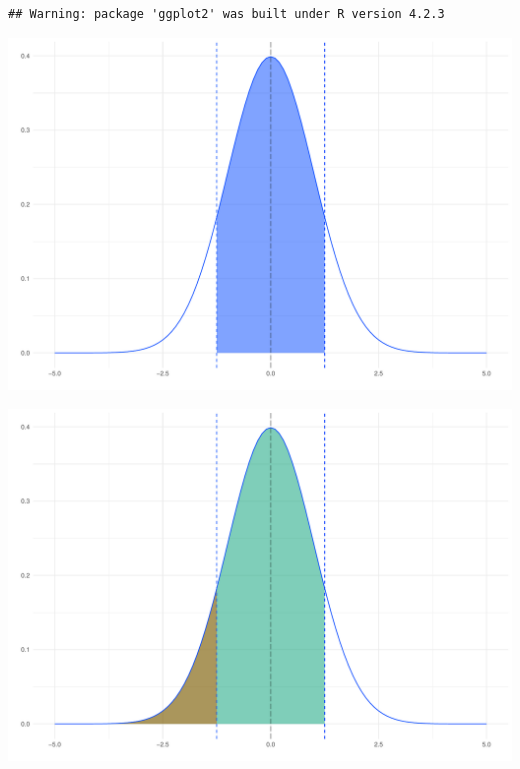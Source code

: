 \documentclass[
  10pt,
  ignorenonframetext,
]{beamer}
\begin{document}
\begin{frame}[fragile]{}
\protect\hypertarget{section}{}
\begin{verbatim}
## Warning: package 'ggplot2' was built under R version 4.2.3
\end{verbatim}

\begin{center}\includegraphics[width=0.5\linewidth]{ECON1013-Lab2_files/figure-beamer/unnamed-chunk-7-1} \end{center}

\begin{center}\includegraphics[width=0.5\linewidth]{ECON1013-Lab2_files/figure-beamer/unnamed-chunk-7-2} \end{center}
\end{frame}
\end{document}
